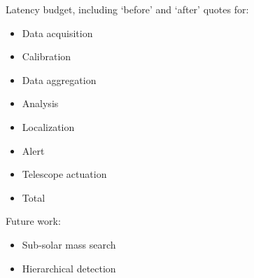 Latency budget, including `before' and `after' quotes for:

\begin{itemize}
\item Data acquisition
\item Calibration
\item Data aggregation
\item Analysis
\item Localization
\item Alert
\item Telescope actuation
\item Total
\end{itemize}

Future work:

\begin{itemize}
\item Sub-solar mass search
\item Hierarchical detection
\end{itemize}
